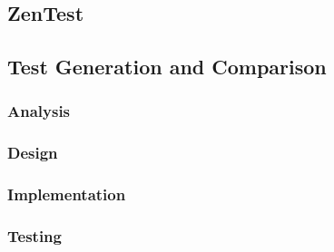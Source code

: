   \subsection{ZenTest}
  \subsection{Test Generation and Comparison}
    \subsubsection{Analysis}
    \subsubsection{Design}
    \subsubsection{Implementation}
    \subsubsection{Testing}
